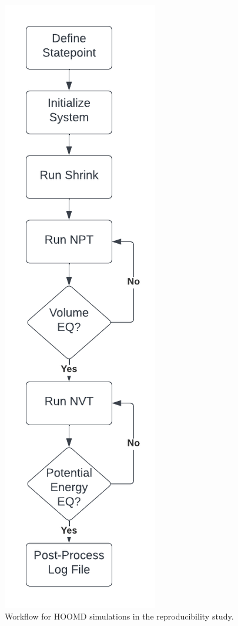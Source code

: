 \begin{figure}[h!]
    \centering
    \includegraphics[width=0.8\linewidth,height=0.6\paperheight,
  keepaspectratio]{figures/rep_study/reproducibility_workflow.pdf}
    \caption{Workflow for HOOMD simulations in the reproducibility study.}\label{fig:rep_workflow}
\end{figure}
